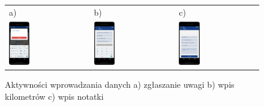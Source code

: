 \begin{figure}[ht]
  \centering
	\begin{tabular}{l l l}
	a) & b) & c) \\
  \includegraphics[width=0.27\textwidth]{rys04/mobilna/zrzut3} & 
	\includegraphics[width=0.27\textwidth]{rys04/mobilna/zrzut4} &
	\includegraphics[width=0.27\textwidth]{rys04/mobilna/zrzut5}
	\end{tabular}
  \caption{Aktywności wprowadzania danych a) zgłaszanie uwagi b) wpis kilometrów c) wpis notatki}
  \label{fig:gui-mobilna-zrzut345}
\end{figure}

